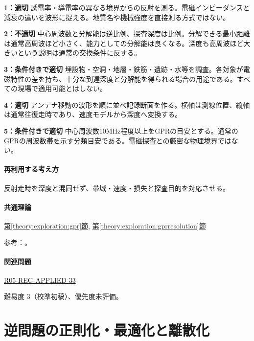 \noindent\textbf{1：適切} 誘電率・導電率の異なる境界からの反射を測る。電磁インピーダンスと減衰の違いを波形に捉える。地質名や機械強度を直接測る方式ではない。\par

\noindent\textbf{2：不適切} 中心周波数と分解能は逆比例、探査深度は比例。分解できる最小距離は通常高周波ほど小さく、能力としての分解能は良くなる。深度も高周波ほど大きいという説明は通常の交換条件に反する。\par

\noindent\textbf{3：条件付きで適切} 埋設物・空洞・地層・鉄筋・遺跡・水等を調査。各対象が電磁特性の差を持ち、十分な到達深度と分解能を得られる場合の用途である。すべての現場で適用可能とはしない。\par

\noindent\textbf{4：適切} アンテナ移動の波形を順に並べ記録断面を作る。横軸は測線位置、縦軸は通常往復走時であり、速度モデルから深度へ変換する。\par

\noindent\textbf{5：条件付きで適切} 中心周波数10MHz程度以上をGPRの目安とする。通常のGPRの周波数帯を示す分類目安である。電磁探査との厳密な物理境界ではない。\par

\paragraph{再利用する考え方} 反射走時を深度と混同せず、帯域・速度・損失と探査目的を対応させる。

\paragraph{共通理論} \hyperref[theory:exploration:gpr]{第\ref*{theory:exploration:gpr}節}, \hyperref[theory:exploration:gprresolution]{第\ref*{theory:exploration:gprresolution}節}

\par 参考：\cite{epa_gpr}。

\paragraph{関連問題} \hyperref[q:r05-reg-applied-33]{R05-REG-APPLIED-33}

\par 難易度 3（校準初稿）、優先度未評価。

\section{逆問題の正則化・最適化と離散化}


